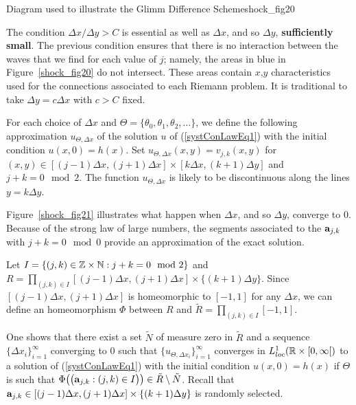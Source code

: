 {Diagram used to illustrate the Glimm Difference Scheme}{shock_fig20}

The condition $\Delta x / \Delta y > C$ is essential as well as
$\Delta x$, and so $\Delta y$, {\bfseries sufficiently small}.
The previous condition ensures that there is no interaction between
the waves that we find for each value of $j$; namely, the areas
in blue in Figure~\ref{shock_fig20} do not intersect.  These areas contain
$x$,$y$ characteristics used for the connections associated to each
Riemann problem.  It is traditional to take $\Delta y = c \Delta x$ with
$c>C$ fixed.

For each choice of $\Delta x$ and
$\Theta = \{\theta_0, \theta_1, \theta_2, \ldots \}$, we
define the following approximation $u_{\Theta, \Delta x}$ of the solution $u$ of
(\ref{systConLawEq1}) with the initial condition $u(x,0) = h(x)$.
Set $u_{\Theta,\Delta x}(x,y) = v_{j,k}(x,y)$ for
$(x,y) \in [(j-1)\Delta x, (j+1)\Delta x]\times [k\Delta x,(k+1)\Delta y]$
and $j+k = 0 \mod{2}$.  The function $u_{\Theta,\Delta x}$ is likely
to be discontinuous along the lines $y = k \Delta y$.

Figure~\ref{shock_fig21} illustrates what happen when $\Delta x$, and
so $\Delta y$, converge to $0$.  Because of the strong law of large numbers,
the segments associated to the $\mathbf{a}_{j,k}$ with $j+k =0 \mod{0}$
provide an approximation of the exact solution.


Let $I = \{ (j,k) \in \mathbb{Z} \times \mathbb{N} : j+k = 0 \mod{2} \}$ and
$\displaystyle R = \prod_{(j,k) \in I} [(j-1)\Delta x,(j+1) \Delta x]
\times \{(k+1)\Delta y\}$.  Since
$[(j-1)\Delta x,(j+1) \Delta x]$ is homeomorphic to
$[-1,1]$ for any $\Delta x$, we can define an homeomorphism $\Phi$
between $R$ and $\displaystyle \tilde{R} = \prod_{(j,k) \in I} [-1,1]$.

One shows that there exist a set $\tilde{N}$ of measure zero in
$\tilde{R}$ and a sequence $\displaystyle \{ \Delta x_i\}_{i=1}^\infty$
converging to $0$ such that
$\displaystyle \{u_{\Theta,\Delta x_i}\}_{i=1}^\infty$ converges in
$L^1_{loc}(\mathbb{R}\times [0,\infty[)$ to a solution of
(\ref{systConLawEq1}) with the initial condition $u(x,0) = h(x)$ if
$\Theta$ is such that
$\displaystyle \Phi\big(\big(\mathbf{a}_{j,k} : (j,k)\in I\big)\big)
\in \tilde{R}\setminus \tilde{N}$.  Recall that $\mathbf{a}_{j,k} \in 
[(j-1)\Delta x,(j+1) \Delta x] \times \{(k+1)\Delta y\}$ is randomly
selected.

